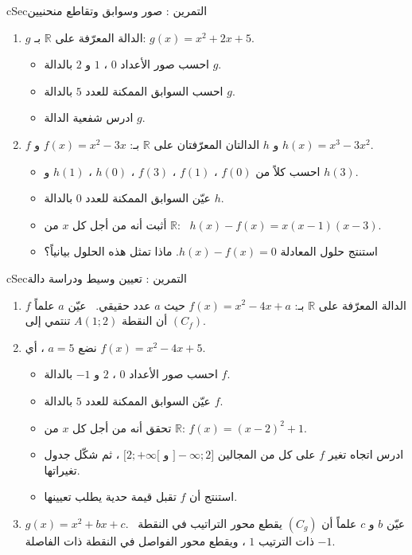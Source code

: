 \documentclass[12pt,a4paper]{article}
\newenvironment{BOX}[2]{\begin{otherlanguage}{english}\begin{arbox}{#1}{#2}}{\end{arbox}\end{otherlanguage}}
\newcounter{exo}
\newenvironment{tamrin}[1]{\stepcounter{exo}\begin{BOX}{cSec}{التمرين \theexo: #1}}{\end{BOX}}
\newcommand{\R}{\mathbb{R}}
\newenvironment{sq}{\begin{itemize}[leftmargin=2.4em,itemsep=3pt]}{\end{itemize}}
\newcommand{\qa}{\item[(أ)]}\newcommand{\qb}{\item[(ب)]}\newcommand{\qc}{\item[(جـ)]}\newcommand{\qd}{\item[(د)]}\newcommand{\qe}{\item[(هـ)]}
\begin{document}
\begin{tamrin}{صور وسوابق وتقاطع منحنيين}
\begin{enumerate}
\item $g$ الدالة المعرّفة على $\R$ بـ: $g(x)=x^2+2x+5$.
\begin{sq}
\qa احسب صور الأعداد $0$ ، $1$ و $2$ بالدالة $g$.
\qb احسب السوابق الممكنة للعدد $5$ بالدالة $g$.
\qc ادرس شفعية الدالة $g$.
\end{sq}
\item $f$ و $h$ الدالتان المعرّفتان على $\R$ بـ: $f(x)=x^2-3x$ و $h(x)=x^3-3x^2$.
\begin{sq}
\qa احسب كلاً من $f(0)$ ، $f(1)$ ، $f(3)$ ، $h(0)$ ، $h(1)$ و $h(3)$.
\qb عيّن السوابق الممكنة للعدد $0$ بالدالة $h$.
\qc أثبت أنه من أجل كل $x$ من $\R$: \ $h(x)-f(x)=x(x-1)(x-3)$.
\qd استنتج حلول المعادلة $h(x)-f(x)=0$. ماذا تمثل هذه الحلول بيانياً؟
\end{sq}
\end{enumerate}
\end{tamrin}

\begin{tamrin}{تعيين وسيط ودراسة دالة}
\begin{enumerate}
\item $f$ الدالة المعرّفة على $\R$ بـ: $f(x)=x^2-4x+a$ حيث $a$ عدد حقيقي. \ عيّن $a$ علماً أن النقطة $A(1;2)$ تنتمي إلى $(C_f)$.
\item نضع $a=5$ ، أي $f(x)=x^2-4x+5$.
\begin{sq}
\qa احسب صور الأعداد $0$ ، $2$ و $-1$ بالدالة $f$.
\qb عيّن السوابق الممكنة للعدد $5$ بالدالة $f$.
\qc تحقق أنه من أجل كل $x$ من $\R$: $f(x)=(x-2)^2+1$.
\qd ادرس اتجاه تغير $f$ على كل من المجالين $]-\infty;2]$ و $[2;+\infty[$ ، ثم شكّل جدول تغيراتها.
\qe استنتج أن $f$ تقبل قيمة حدية يطلب تعيينها.
\end{sq}
\item $g(x)=x^2+bx+c$. \ عيّن $b$ و $c$ علماً أن $(C_g)$ يقطع محور التراتيب في النقطة ذات الترتيب $1$ ، ويقطع محور الفواصل في النقطة ذات الفاصلة $-1$.
\end{enumerate}
\end{tamrin}

\end{document}
